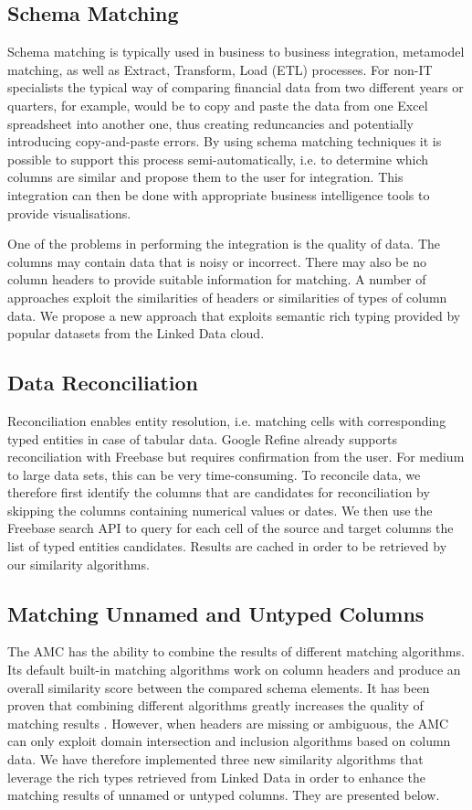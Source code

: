 \documentclass{sig-alternate}
\begin{document}
\subsection{Schema Matching }
Schema matching is typically used in business to business integration, metamodel matching, as well as Extract, Transform, Load (ETL) processes. For non-IT specialists the typical way of comparing financial data from two different years or quarters, for example, would be to copy and paste the data from one Excel spreadsheet into another one, thus creating reduncancies and potentially introducing copy-and-paste errors. By using schema matching techniques it is possible to support this process semi-automatically, i.e. to determine which columns are similar and propose them to the user for integration. This integration can then be done with appropriate business intelligence tools to provide visualisations.

One of the problems in performing the integration is the quality of data. The columns may contain data that is noisy or incorrect. There may also be no column headers to provide suitable information for matching. A number of approaches exploit the similarities of headers or similarities of types of column data. We propose a new approach that exploits semantic rich typing provided by popular datasets from the Linked Data cloud. 


\subsection{Data Reconciliation}

Reconciliation enables entity resolution, i.e. matching cells with corresponding typed entities in case of tabular data. Google Refine already supports reconciliation with Freebase but requires confirmation from the user. For medium to large data sets, this can be very time-consuming. To reconcile data, we therefore first identify the columns that are candidates for reconciliation by skipping the columns containing numerical values or dates. We then use the Freebase search API to query for each cell of the source and target columns the list of typed entities candidates. Results are cached in order to be retrieved by our similarity algorithms.  


\subsection{Matching Unnamed and Untyped Columns}
The AMC has the ability to combine the results of different matching algorithms. Its default built-in matching algorithms work on column headers and produce an overall similarity score between the compared schema elements. It has been proven that combining different algorithms greatly increases the quality of matching results \cite{conf/icde/PeukertER12}\cite{conf/wise/StracciaT05}. However, when headers are missing or ambiguous, the AMC can only exploit domain intersection and inclusion algorithms based on column data. We have therefore implemented three new similarity algorithms that leverage the rich types retrieved from Linked Data in order to enhance the matching results of unnamed or untyped columns. They are presented below.
\end{document}
